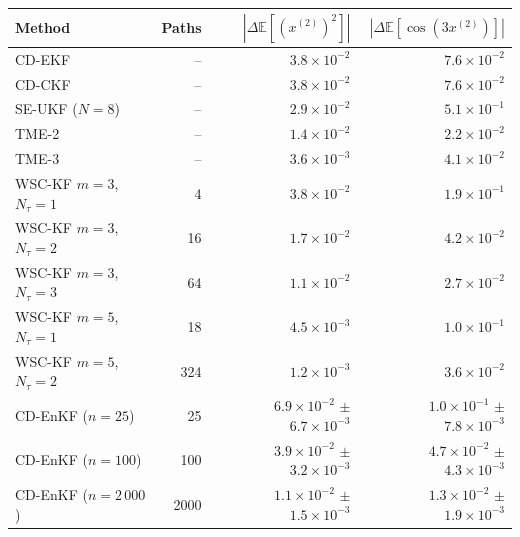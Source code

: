 \begin{tabular}{lrrr}
\toprule
Method & Paths & $|\Delta\mathbb{E}[(x^{(2)})^2]|$ & $|\Delta\mathbb{E}[\cos(3x^{(2)})]|$ \\
\midrule
CD-EKF & -- & $3.8\times10^{-2}$ & $7.6\times10^{-2}$ \\
CD-CKF & -- & $3.8\times10^{-2}$ & $7.6\times10^{-2}$ \\
SE-UKF ($N=8$) & -- & $2.9\times10^{-2}$ & $5.1\times10^{-1}$ \\
TME-2 & -- & $1.4\times10^{-2}$ & $2.2\times10^{-2}$ \\
TME-3 & -- & $3.6\times10^{-3}$ & $4.1\times10^{-2}$ \\
WSC-KF $m=3$, $N_\tau=1$ & 4 & $3.8\times10^{-2}$ & $1.9\times10^{-1}$ \\
WSC-KF $m=3$, $N_\tau=2$ & 16 & $1.7\times10^{-2}$ & $4.2\times10^{-2}$ \\
WSC-KF $m=3$, $N_\tau=3$ & 64 & $1.1\times10^{-2}$ & $2.7\times10^{-2}$ \\
WSC-KF $m=5$, $N_\tau=1$ & 18 & $4.5\times10^{-3}$ & $1.0\times10^{-1}$ \\
WSC-KF $m=5$, $N_\tau=2$ & 324 & $1.2\times10^{-3}$ & $3.6\times10^{-2}$ \\
CD-EnKF ($n=25$) & 25 & $6.9\times10^{-2}$ $\pm$ $6.7\times10^{-3}$ & $1.0\times10^{-1}$ $\pm$ $7.8\times10^{-3}$ \\
CD-EnKF ($n=100$) & 100 & $3.9\times10^{-2}$ $\pm$ $3.2\times10^{-3}$ & $4.7\times10^{-2}$ $\pm$ $4.3\times10^{-3}$ \\
CD-EnKF ($n=2\,000$) & 2000 & $1.1\times10^{-2}$ $\pm$ $1.5\times10^{-3}$ & $1.3\times10^{-2}$ $\pm$ $1.9\times10^{-3}$ \\
\bottomrule
\end{tabular}
